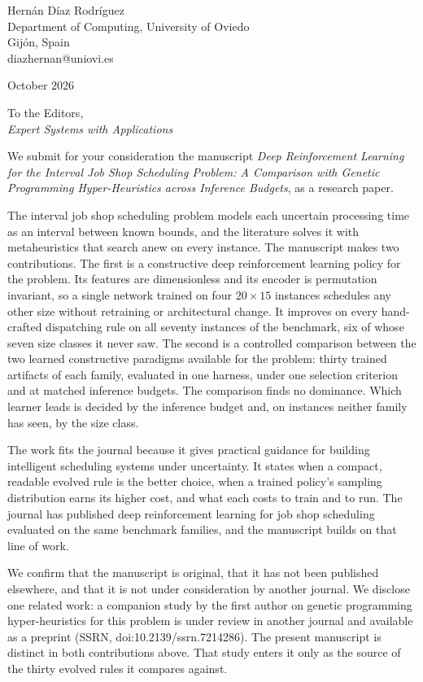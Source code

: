 \documentclass[11pt]{article}
\begin{document}
\noindent
Hern\'an D\'iaz Rodr\'iguez\\
Department of Computing, University of Oviedo\\
Gij\'on, Spain\\
diazhernan@uniovi.es

\vspace{1em}
 October 2026

\vspace{1em}
\noindent To the Editors,\\
\emph{Expert Systems with Applications}

\vspace{1em}

We submit for your consideration the manuscript \emph{Deep
Reinforcement Learning for the Interval Job Shop Scheduling Problem:
A Comparison with Genetic Programming Hyper-Heuristics across
Inference Budgets}, as a research paper.

The interval job shop scheduling problem models each uncertain
processing time as an interval between known bounds, and the
literature solves it with metaheuristics that search anew on every
instance. The manuscript makes two contributions. The first is a
constructive deep reinforcement learning policy for the problem. Its
features are dimensionless and its encoder is permutation invariant,
so a single network trained on four $20\times15$ instances schedules
any other size without retraining or architectural change. It
improves on every hand-crafted dispatching rule on all seventy
instances of the benchmark, six of whose seven size classes it never
saw. The second is a controlled comparison between the two learned
constructive paradigms available for the problem: thirty trained
artifacts of each family, evaluated in one harness, under one
selection criterion and at matched inference budgets. The comparison
finds no dominance. Which learner leads is decided by the inference
budget and, on instances neither family has seen, by the size class.

The work fits the journal because it gives practical guidance for
building intelligent scheduling systems under uncertainty. It states
when a compact, readable evolved rule is the better choice, when a
trained policy's sampling distribution earns its higher cost, and
what each costs to train and to run. The journal has published deep
reinforcement learning for job shop scheduling evaluated on the same
benchmark families, and the manuscript builds on that line of work.

We confirm that the manuscript is original, that it has not been
published elsewhere, and that it is not under consideration by another
journal. We disclose one related work: a companion study by the first
author on genetic programming hyper-heuristics for this problem is
under review in another journal and available as a preprint (SSRN,
doi:10.2139/ssrn.7214286). The present manuscript is distinct in both
contributions above. That study enters it only as the source of the
thirty evolved rules it compares against.
\end{document}
